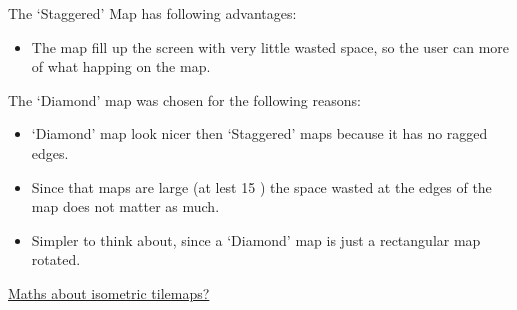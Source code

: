 The `Staggered' Map has following advantages:
\begin{itemize}
	\item The map fill up the screen with very little wasted space, so the user can more of what happing on the map.
\end{itemize} 

The `Diamond' map was chosen for the following reasons:
\begin{itemize}
	\item `Diamond' map look nicer then `Staggered' maps because it has no ragged edges.
	\item Since that maps are large (at lest 15 ) the space wasted at the edges of the map does not matter as much.
	\item Simpler to think about, since a `Diamond' map is just a rectangular map rotated.
\end{itemize}

\underline{Maths about isometric tilemaps? }